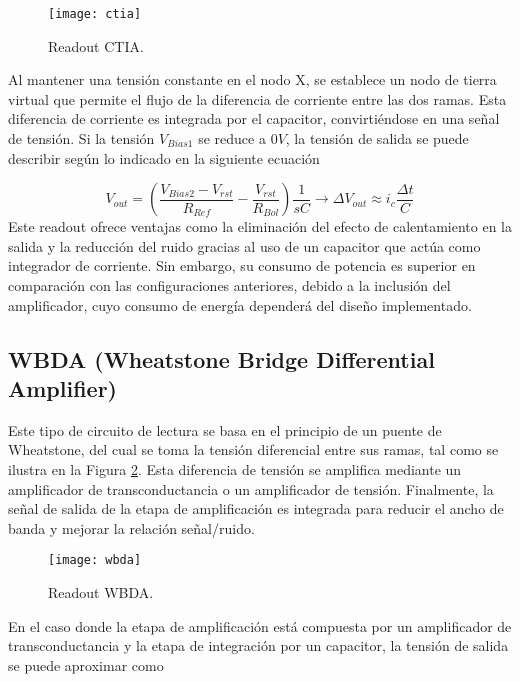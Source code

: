            \begin{figure}[hbtp]
                \centering
                \texttt{[image: ctia]}
                \caption{Readout CTIA.}
                \label{fig:ctia}
            \end{figure}

Al mantener una tensión constante en el nodo X, se establece un nodo de tierra virtual que permite el flujo de la diferencia de corriente entre las dos ramas. Esta diferencia de corriente es integrada por el capacitor, convirtiéndose en una señal de tensión. Si la tensión $V_{Bias1}$ se reduce a $0V$, la tensión de salida se puede describir según lo indicado en la siguiente ecuación \cite{BlancoMDA}

        \begin{equation}
        V_{out} =\left(\frac{V_{Bias2}-V_{rst}}{R_{Ref}}-\frac{V_{rst}}{R_{Bol}}\right) \frac{1}{sC} \to \Delta V_{out} \approx i_{c}\frac{\Delta t}{C}
        \label{eq:ctia}
        \end{equation}
Este readout ofrece ventajas como la eliminación del efecto de calentamiento en la salida y la reducción del ruido gracias al uso de un capacitor que actúa como integrador de corriente. Sin embargo, su consumo de potencia es superior en comparación con las configuraciones anteriores, debido a la inclusión del amplificador, cuyo consumo de energía dependerá del diseño implementado.

\subsection{WBDA (Wheatstone Bridge Differential Amplifier)}
Este tipo de circuito de lectura se basa en el principio de un puente de Wheatstone, del cual se toma la tensión diferencial entre sus ramas, tal como se ilustra en la Figura \ref{fig:wbda}. Esta diferencia de tensión se amplifica mediante un amplificador de transconductancia o un amplificador de tensión. Finalmente, la señal de salida de la etapa de amplificación es integrada para reducir el ancho de banda y mejorar la relación señal/ruido.
            \begin{figure}[hbtp]
                \centering
                \texttt{[image: wbda]}
                \caption{Readout WBDA.}
                \label{fig:wbda}
            \end{figure}


En el caso donde la etapa de amplificación está compuesta por un amplificador de transconductancia y la etapa de integración por un capacitor, la tensión de salida se puede aproximar como

